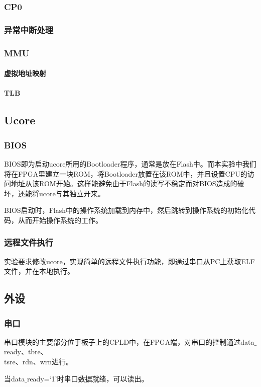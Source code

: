 \subsubsection{CP0}
\subsubsection{异常中断处理}
\subsubsection{MMU}
\paragraph{虚拟地址映射}
\paragraph{TLB}

\subsection{Ucore}
\subsubsection{BIOS}
BIOS即为启动ucore所用的Bootloader程序，通常是放在Flash中。而本实验中我们将在FPGA里建立一块ROM，将Bootloader放置在该ROM中，并且设置CPU的访问地址从该ROM开始。这样能避免由于Flash的读写不稳定而对BIOS造成的破坏，还能将ucore与其独立开来。

BIOS启动时，Flash中的操作系统加载到内存中，然后跳转到操作系统的初始化代码，从而开始操作系统的工作。
\subsubsection{远程文件执行}
实验要求修改ucore，实现简单的远程文件执行功能，即通过串口从PC上获取ELF文件，并在本地执行。
\subsection{外设}
\subsubsection{串口}
串口模块的主要部分位于板子上的CPLD中，在FPGA端，对串口的控制通过data$\_$ready、tbre、\\
tsre、rdn、wrn进行。

当data$\_$ready=‘1’时串口数据就绪，可以读出。

